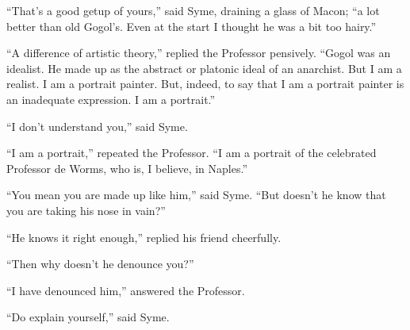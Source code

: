 “That’s a good getup of yours,” said Syme, draining a glass of Macon; “a lot better than old Gogol’s. Even at the start I thought he was a bit too hairy.”

“A difference of artistic theory,” replied the Professor pensively. “Gogol was an idealist. He made up as the abstract or platonic ideal of an anarchist. But I am a realist. I am a portrait painter. But, indeed, to say that I am a portrait painter is an inadequate expression. I am a portrait.”

“I don’t understand you,” said Syme.

“I am a portrait,” repeated the Professor. “I am a portrait of the celebrated Professor de Worms, who is, I believe, in Naples.”

“You mean you are made up like him,” said Syme. “But doesn’t he know that you are taking his nose in vain?”

“He knows it right enough,” replied his friend cheerfully.

“Then why doesn’t he denounce you?”

“I have denounced him,” answered the Professor.

“Do explain yourself,” said Syme.


